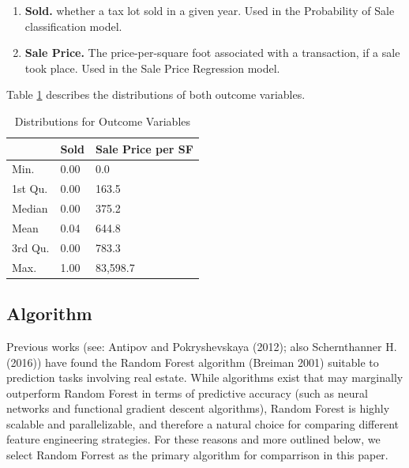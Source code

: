 \documentclass[12pt,]{article}
\providecommand{\tightlist}{%
  \setlength{\itemsep}{0pt}\setlength{\parskip}{0pt}}
\begin{document}
\begin{enumerate}
\def\labelenumi{\arabic{enumi})}
\tightlist
\item
  \textbf{Sold.} whether a tax lot sold in a given year. Used in the
  Probability of Sale classification model.
\item
  \textbf{Sale Price.} The price-per-square foot associated with a
  transaction, if a sale took place. Used in the Sale Price Regression
  model.
\end{enumerate}

\noindent Table \ref{tab:OutcomeDistro} describes the distributions of
both outcome variables.

\begin{table}

\caption{\label{tab:table 4}\label{tab:OutcomeDistro} Distributions for Outcome Variables}
\centering
\begin{tabular}[t]{lll}
\toprule
  & Sold & Sale Price per SF\\
\midrule
Min. & 0.00 & 0.0\\
1st Qu. & 0.00 & 163.5\\
Median & 0.00 & 375.2\\
Mean & 0.04 & 644.8\\
3rd Qu. & 0.00 & 783.3\\
Max. & 1.00 & 83,598.7\\
\bottomrule
\end{tabular}
\end{table}

\hypertarget{algorithm}{%
\subsection{Algorithm}\label{algorithm}}

Previous works (see: Antipov and Pokryshevskaya (2012); also
Schernthanner H. (2016)) have found the Random Forest algorithm (Breiman
2001) suitable to prediction tasks involving real estate. While
algorithms exist that may marginally outperform Random Forest in terms
of predictive accuracy (such as neural networks and functional gradient
descent algorithms), Random Forest is highly scalable and
parallelizable, and therefore a natural choice for comparing different
feature engineering strategies. For these reasons and more outlined
below, we select Random Forrest as the primary algorithm for comparrison
in this paper.
\end{document}
